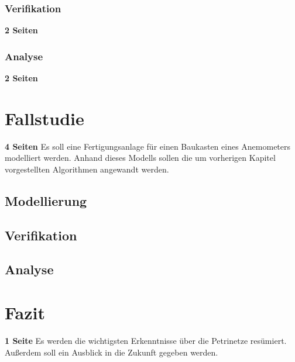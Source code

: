 \documentclass{article}
\begin{document}
\subsubsection{Verifikation}
\textbf{2 Seiten}
\subsubsection{Analyse}
\textbf{2 Seiten}

\section{Fallstudie}
\textbf{4 Seiten}
Es soll eine Fertigungsanlage für einen Baukasten eines Anemometers modelliert werden.
Anhand dieses Modells sollen die um vorherigen Kapitel vorgestellten Algorithmen angewandt werden.
\subsection{Modellierung}
\subsection{Verifikation}
\subsection{Analyse}

\section{Fazit}
\textbf{1 Seite}
Es werden die wichtigsten Erkenntnisse über die Petrinetze resümiert.
Außerdem soll ein Ausblick in die Zukunft gegeben werden.
\end{document}
